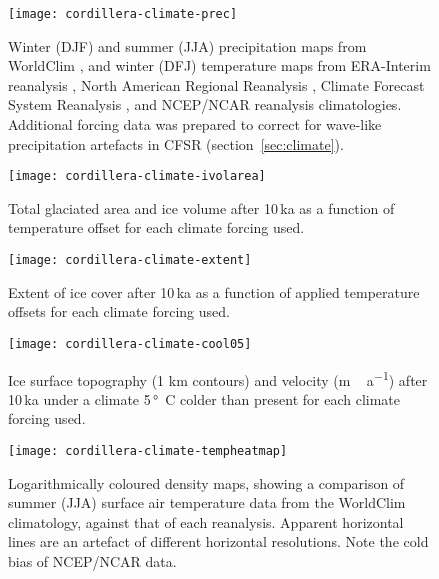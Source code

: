 \begin{figure*}[t]
	\vspace*{2mm}
	\begin{center}
		\texttt{[image: cordillera-climate-prec]}
	\end{center}
	\caption{Winter (DJF) and summer (JJA) precipitation maps from WorldClim \citep{data:worldclim}, and winter (DFJ) temperature maps from ERA-Interim reanalysis \citep{data:erai}, North American Regional Reanalysis \citep[NARR;][]{data:narr}, Climate Forecast System Reanalysis \citep[CFSR;][]{data:cfsr}, and NCEP/NCAR reanalysis \citep{data:ncar} climatologies. Additional forcing data was prepared to correct for wave-like precipitation artefacts in CFSR (section~\ref{sec:climate}).}
	\label{fig:prec}
\end{figure*}

\begin{figure}[t]
	\vspace*{2mm}
	\begin{center}
		\texttt{[image: cordillera-climate-ivolarea]}
	\end{center}
	\caption{Total glaciated area and ice volume after 10\,ka as a function of temperature offset for each climate forcing used.}
	\label{fig:ivolarea}
\end{figure}

\begin{figure*}[t]
	\vspace*{2mm}
	\begin{center}
		\texttt{[image: cordillera-climate-extent]}
	\end{center}
	\caption{Extent of ice cover after 10\,ka as a function of applied temperature offsets for each climate forcing used.}
	\label{fig:extent}
\end{figure*}

\begin{figure*}[t]
	\vspace*{2mm}
	\begin{center}
		\texttt{[image: cordillera-climate-cool05]}
	\end{center}
	\caption{Ice surface topography (1 km contours) and velocity (\unit{m\,a^{-1}}) after 10\,ka under a climate 5\,\unit{\degree C} colder than present for each climate forcing used.}
	\label{fig:cool05}
\end{figure*}

\begin{figure}[t]
	\vspace*{2mm}
	\begin{center}
		\texttt{[image: cordillera-climate-tempheatmap]}
	\end{center}
	\caption{Logarithmically coloured density maps, showing a comparison of summer (JJA) surface air temperature data from the WorldClim climatology, against that of each reanalysis. Apparent horizontal lines are an artefact of different horizontal resolutions. Note the cold bias of NCEP/NCAR data.}
	\label{fig:tempheatmap}
\end{figure}

